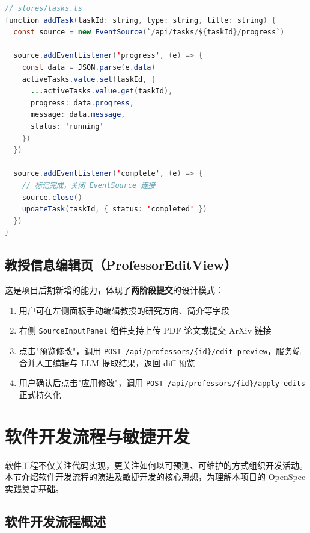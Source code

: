 \documentclass[11pt]{article}
\begin{document}
\begin{lstlisting}[language=Java, caption=任务 Store 的 SSE 订阅逻辑]
// stores/tasks.ts
function addTask(taskId: string, type: string, title: string) {
  const source = new EventSource(`/api/tasks/${taskId}/progress`)

  source.addEventListener('progress', (e) => {
    const data = JSON.parse(e.data)
    activeTasks.value.set(taskId, {
      ...activeTasks.value.get(taskId),
      progress: data.progress,
      message: data.message,
      status: 'running'
    })
  })

  source.addEventListener('complete', (e) => {
    // 标记完成，关闭 EventSource 连接
    source.close()
    updateTask(taskId, { status: 'completed' })
  })
}
\end{lstlisting}

\subsection{教授信息编辑页（ProfessorEditView）}

这是项目后期新增的能力，体现了\textbf{两阶段提交}的设计模式：

\begin{enumerate}
    \item 用户可在左侧面板手动编辑教授的研究方向、简介等字段
    \item 右侧 \texttt{SourceInputPanel} 组件支持上传 PDF 论文或提交 ArXiv 链接
    \item 点击"预览修改"，调用 \texttt{POST /api/professors/\{id\}/edit-preview}，服务端合并人工编辑与 LLM 提取结果，返回 diff 预览
    \item 用户确认后点击"应用修改"，调用 \texttt{POST /api/professors/\{id\}/apply-edits} 正式持久化
\end{enumerate}

\section{软件开发流程与敏捷开发}

软件工程不仅关注代码实现，更关注如何以可预测、可维护的方式组织开发活动。本节介绍软件开发流程的演进及敏捷开发的核心思想，为理解本项目的 OpenSpec 实践奠定基础。

\subsection{软件开发流程概述}
\end{document}
